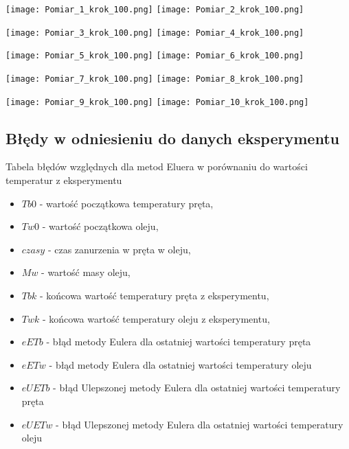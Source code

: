 \documentclass[varwidth,12pt,a4paper]{article}
\begin{document}
\texttt{[image: Pomiar\_1\_krok\_100.png]}\hspace{0.1\textwidth}%
\texttt{[image: Pomiar\_2\_krok\_100.png]}\par
\texttt{[image: Pomiar\_3\_krok\_100.png]}\hspace{0.1\textwidth}%
\texttt{[image: Pomiar\_4\_krok\_100.png]}\par
\texttt{[image: Pomiar\_5\_krok\_100.png]}\hspace{0.1\textwidth}%
\texttt{[image: Pomiar\_6\_krok\_100.png]}\par
\texttt{[image: Pomiar\_7\_krok\_100.png]}\hspace{0.1\textwidth}%
\texttt{[image: Pomiar\_8\_krok\_100.png]}\par
\texttt{[image: Pomiar\_9\_krok\_100.png]}\hspace{0.1\textwidth}%
\texttt{[image: Pomiar\_10\_krok\_100.png]}\par

\subsection{Błędy w odniesieniu do danych eksperymentu}

\begin{table}[H]
    \centering{}
    \caption{Tabela błędów względnych dla metod Eluera w porównaniu do wartości temperatur z eksperymentu}
    \label{table:tabelaPomiarowBledowEuler}
\end{table}

\begin{itemize}
    \item $Tb0$ - wartość początkowa temperatury pręta,
    \item $Tw0$ - wartość początkowa oleju,
    \item $czasy$ - czas zanurzenia w pręta w oleju,
    \item $Mw$ - wartość masy oleju,
    \item $Tbk$ - końcowa wartość temperatury pręta z eksperymentu,
    \item $Twk$ - końcowa wartość temperatury oleju z eksperymentu,
    \item $eETb$ - błąd metody Eulera dla ostatniej wartości temperatury pręta
    \item $eETw$ - błąd metody Eulera dla ostatniej wartości temperatury oleju
    \item $eUETb$ - błąd Ulepszonej metody Eulera dla ostatniej wartości temperatury pręta
    \item $eUETw$ - błąd Ulepszonej metody Eulera dla ostatniej wartości temperatury oleju
\end{itemize}
\end{document}
